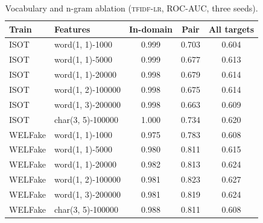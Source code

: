 \begin{table}[h]
\centering
\caption{Vocabulary and n-gram ablation (\textsc{tfidf-lr}, ROC-AUC, three seeds).}\label{tab:vocab}
\small
\begin{tabular}{@{}llccc@{}}
\toprule
Train & Features & In-domain & Pair & All targets \\
\midrule
ISOT & word(1, 1)-1000 & 0.999 & 0.703 & 0.604 \\
ISOT & word(1, 1)-5000 & 0.999 & 0.677 & 0.613 \\
ISOT & word(1, 1)-20000 & 0.998 & 0.679 & 0.614 \\
ISOT & word(1, 2)-100000 & 0.998 & 0.675 & 0.614 \\
ISOT & word(1, 3)-200000 & 0.998 & 0.663 & 0.609 \\
ISOT & char(3, 5)-100000 & 1.000 & 0.734 & 0.620 \\
WELFake & word(1, 1)-1000 & 0.975 & 0.783 & 0.608 \\
WELFake & word(1, 1)-5000 & 0.980 & 0.811 & 0.615 \\
WELFake & word(1, 1)-20000 & 0.982 & 0.813 & 0.624 \\
WELFake & word(1, 2)-100000 & 0.981 & 0.823 & 0.627 \\
WELFake & word(1, 3)-200000 & 0.981 & 0.819 & 0.624 \\
WELFake & char(3, 5)-100000 & 0.988 & 0.811 & 0.608 \\
\bottomrule
\end{tabular}
\end{table}
